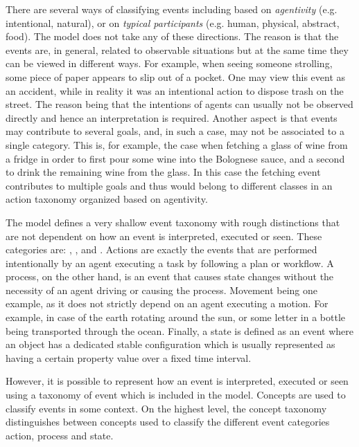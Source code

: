 There are several ways of classifying events including based on \emph{agentivity} (e.g. intentional, natural), or on \emph{typical participants} (e.g. human, physical, abstract, food).
The \neem model does not take any of these directions.
The reason is that the events are, in general, related to observable situations but at the same time they can be viewed in different ways.
For example, when seeing someone strolling, some piece of paper appears to slip out of a pocket. One may view this event as an accident, while in reality it was an intentional action to dispose trash on the street.
The reason being that the intentions of agents can usually not be observed directly and hence an interpretation is required.
Another aspect is that events may contribute to several goals, and, in such a case, may not be associated to a single category.
This is, for example, the case when fetching a glass of wine from a fridge in order to first pour some wine into the Bolognese sauce, and a second to drink the remaining wine from the glass.
In this case the fetching event contributes to multiple goals and thus would belong to different classes in an action taxonomy organized based on agentivity.

The \neem model defines a very shallow event taxonomy with rough distinctions that are not dependent on how an event is interpreted, executed or seen.
These categories are: , , and .
Actions are exactly the events that are performed intentionally by an agent executing a task by following a plan or workflow.
A process, on the other hand, is an event that causes state changes without the necessity of an agent driving or causing the process.
Movement being one example, as it does not strictly depend on an agent executing a motion.
For example, in case of the earth rotating around the sun, or some letter in a bottle being transported through the ocean.
Finally, a state is defined as an event where an object has a dedicated stable configuration which is usually represented as having a certain property value over a fixed time interval.

However, it is possible to represent how an event is interpreted, executed or seen using a taxonomy of event  which is included in the \neem model.
Concepts are used to classify events in some context.
On the highest level, the concept taxonomy distinguishes between concepts used to classify the different event categories action, process and state.

